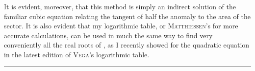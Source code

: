 \par
\noindent\hspace*{\parindent}It is evident, moreover, that this method is simply an indirect solution of the familiar cubic equation relating the tangent of half the anomaly to the area of the sector. It is also evident that my logarithmic table, or \textsc{Matthiessen}'s for more accurate calculations, can be used in much the same way to find very conveniently all the real roots of , as I recently showed for the quadratic equation in the latest edition of \textsc{Vega}'s logarithmic table.
\par\medskip
\begin{center}\rule{.2\linewidth}{.4pt}\end{center}
